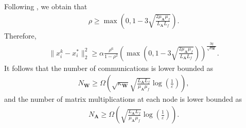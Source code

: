 \documentclass{article}
\newcommand{\norm}[1]{\|#1\|}
\newcommand{\sqn}[1]{\norm{#1}^2}
\newcommand{\cM}{\mathcal{M}}
\newcommand{\cH}{\mathcal{H}}
\newcommand{\cV}{\mathcal{V}}
\newcommand{\mA}{\mathbf{A}}
\newcommand{\mW}{\mathbf{W}}
\newcommand{\cbraces}[1]{\left( #1 \right)}
\newcommand{\eps}{\varepsilon}
\begin{document}
Following \cite{kovalev2021lower}, we obtain that 
\begin{align*}
	\rho\geq \max\cbraces{0, 1 - 3\sqrt{\frac{2\mu_\mA \mu_f}{L_\mA L_f}}}.
\end{align*}
Therefore,
\begin{align*}
	\norm{x_i^k - x_i^*}_2^2\geq \alpha\frac{\rho^6}{1 - \rho^2} \cbraces{\max\cbraces{0, 1 - 3\sqrt{\frac{2\mu_\mA \mu_f}{L_\mA L_f}}}}^{\frac{3q}{\sqrt{\kappa_\mW}}}.
\end{align*}
It follows that the number of communications is lower bounded as
\begin{align}\label{eq:lower_bound_communications}
	N_{\mW}\geq \Omega\cbraces{\sqrt{\kappa_\mW}\sqrt{\frac{L_\mA L_f}{\mu_\mA \mu_f}} \log\cbraces{\frac{1}{\eps}}},
\end{align}
and the number of matrix multiplications at each node  is lower bounded as
\begin{align}\label{eq:lower_bound_matrix_communications}
	N_{\mA}\geq \Omega\cbraces{\sqrt{\frac{L_\mA L_f}{\mu_\mA \mu_f}} \log\cbraces{\frac{1}{\eps}}}.
\end{align}
\end{document}
